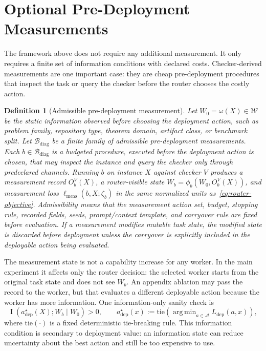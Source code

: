 \documentclass{article}
\newtheorem{definition}{Definition}
\DeclareMathOperator*{\argmin}{arg\,min}
\DeclareMathOperator{\MI}{I}
\newcommand{\cA}{\mathcal{A}}
\newcommand{\cBdiag}{\mathcal{B}_{\mathrm{diag}}}
\newcommand{\cW}{\mathcal{W}}
\begin{document}
\section{Optional Pre-Deployment Measurements}
\label{sec:measurements}

The framework above does not require any additional measurement.
It only requires a finite set of information conditions with declared costs.
Checker-derived measurements are one important case: they are cheap pre-deployment procedures that inspect the task or query the checker before the router chooses the costly action.

\begin{definition}[Admissible pre-deployment measurement]
Let $W_0=\omega(X)\in\cW$ be the static information observed before choosing the deployment action, such as problem family, repository type, theorem domain, artifact class, or benchmark split.
Let $\cBdiag$ be a finite family of admissible pre-deployment measurements.
Each $b\in\cBdiag$ is a budgeted procedure, executed before the deployment action is chosen, that may inspect the instance and query the checker only through predeclared channels.
Running $b$ on instance $X$ against checker $V$ produces a measurement record $O_b^V(X)$, a router-visible state $W_b=\phi_b(W_0,O_b^V(X))$, and measurement loss $\ell_{\mathrm{meas}}(b,X;\zeta_b)$ in the same normalized units as~\eqref{eq:router-objective}.
Admissibility means that the measurement action set, budget, stopping rule, recorded fields, seeds, prompt/context template, and carryover rule are fixed before evaluation.
If a measurement modifies mutable task state, the modified state is discarded before deployment unless the carryover is explicitly included in the deployable action being evaluated.
\end{definition}

The measurement state is not a capability increase for any worker.
In the main experiment it affects only the router decision: the selected worker starts from the original task state and does not see $W_b$.
An appendix ablation may pass the record to the worker, but that evaluates a different deployable action because the worker has more information.
One information-only sanity check is
\[
\MI(a^\star_{\mathrm{dep}}(X);W_b\mid W_0)>0,
\qquad
a^\star_{\mathrm{dep}}(x):=\mathrm{tie}\!\left(\argmin_{a\in\cA}L_{\mathrm{dep}}(a,x)\right),
\]
where $\mathrm{tie}(\cdot)$ is a fixed deterministic tie-breaking rule.
This information condition is secondary to deployment value: an information state can reduce uncertainty about the best action and still be too expensive to use.
\end{document}
